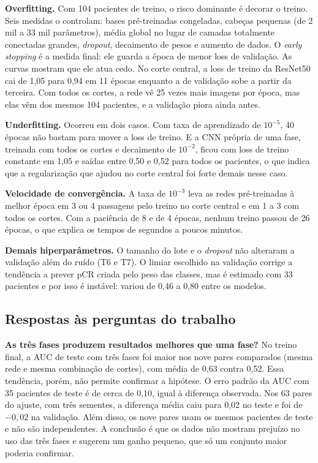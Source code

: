 \documentclass[12pt]{article}
\begin{document}
\textbf{Overfitting.} Com 104 pacientes de treino, o risco dominante é decorar o treino. Seis medidas o
controlam: bases pré-treinadas congeladas, cabeças pequenas (de 2 mil a 33 mil parâmetros), média global
no lugar de camadas totalmente conectadas grandes, \textit{dropout}, decaimento de pesos e aumento de
dados. O \textit{early stopping} é a medida final: ele guarda a época de menor loss de validação. As
curvas mostram que ele atua cedo. No corte central, a loss de treino da ResNet50 cai de 1,05 para 0,94 em
11 épocas enquanto a de validação sobe a partir da terceira. Com todos os cortes, a rede vê 25 vezes mais
imagens por época, mas elas vêm dos mesmos 104 pacientes, e a validação piora ainda antes.

\textbf{Underfitting.} Ocorreu em dois casos. Com taxa de aprendizado de $10^{-5}$, 40 épocas não bastam
para mover a loss de treino. E a CNN própria de uma fase, treinada com todos os cortes e decaimento de
$10^{-2}$, ficou com loss de treino constante em 1,05 e saídas entre 0,50 e 0,52 para todos os pacientes,
o que indica que a regularização que ajudou no corte central foi forte demais nesse caso.

\textbf{Velocidade de convergência.} A taxa de $10^{-3}$ leva as redes pré-treinadas à melhor época em
3 ou 4 passagens pelo treino no corte central e em 1 a 3 com todos os cortes. Com a paciência de 8 e de 4
épocas, nenhum treino passou de 26 épocas, o que explica os tempos de segundos a poucos minutos.

\textbf{Demais hiperparâmetros.} O tamanho do lote e o \textit{dropout} não alteraram a validação além do
ruído (T6 e T7). O limiar escolhido na validação corrige a tendência a prever pCR criada pelo peso das
classes, mas é estimado com 33 pacientes e por isso é instável: variou de 0,46 a 0,80 entre os modelos.

\subsection{Respostas às perguntas do trabalho}

\textbf{As três fases produzem resultados melhores que uma fase?} No treino final, a AUC de teste com
três fases foi maior nos nove pares comparados (mesma rede e mesma combinação de cortes), com média de
0,63 contra 0,52. Essa tendência, porém, não permite confirmar a hipótese. O erro padrão da AUC com 35
pacientes de teste é de cerca de 0,10, igual à diferença observada. Nos 63 pares do ajuste, com três
sementes, a diferença média caiu para 0,02 no teste e foi de $-0{,}02$ na validação. Além disso, os nove
pares usam os mesmos pacientes de teste e não são independentes. A conclusão é que os dados não mostram
prejuízo no uso das três fases e sugerem um ganho pequeno, que só um conjunto maior poderia confirmar.
\end{document}
